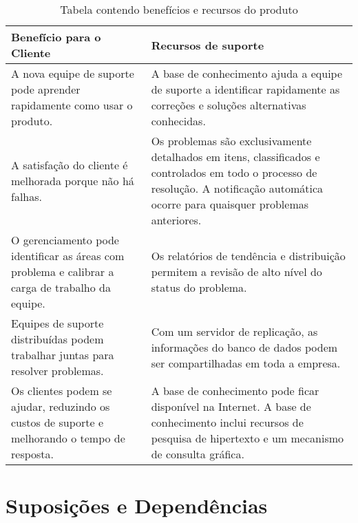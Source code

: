 \documentclass{report}
\begin{document}
\begin{table}[H]
	\centering

	\begin{tabularx}{\textwidth}{X|X}
		\textbf{Benefício para o Cliente}                                                                & \textbf{Recursos de suporte}                                                                                                                                                           \\
		\hline
		A nova equipe de suporte pode aprender rapidamente como usar o produto.                          & A base de conhecimento ajuda a equipe de suporte a identificar rapidamente as correções e soluções alternativas conhecidas.                                                            \\
		A satisfação do cliente é melhorada porque não há falhas.                                        & Os problemas são exclusivamente detalhados em itens, classificados e controlados em todo o processo de resolução. A notificação automática ocorre para quaisquer problemas anteriores. \\
		O gerenciamento pode identificar as áreas com problema e calibrar a carga de trabalho da equipe. & Os relatórios de tendência e distribuição permitem a revisão de alto nível do status do problema.                                                                                      \\
		Equipes de suporte distribuídas podem trabalhar juntas para resolver problemas.                  & Com um servidor de replicação, as informações do banco de dados podem ser compartilhadas em toda a empresa.                                                                            \\
		Os clientes podem se ajudar, reduzindo os custos de suporte e melhorando o tempo de resposta.    & A base de conhecimento pode ficar disponível na Internet. A base de conhecimento inclui recursos de pesquisa de hipertexto e um mecanismo de consulta gráfica.                         \\
		\hline
	\end{tabularx}

	\caption[Benefícios e Recursos]{Tabela contendo benefícios e recursos do produto}
	\label{tab:beneficios}

\end{table}

\section{Suposições e Dependências}
\end{document}
